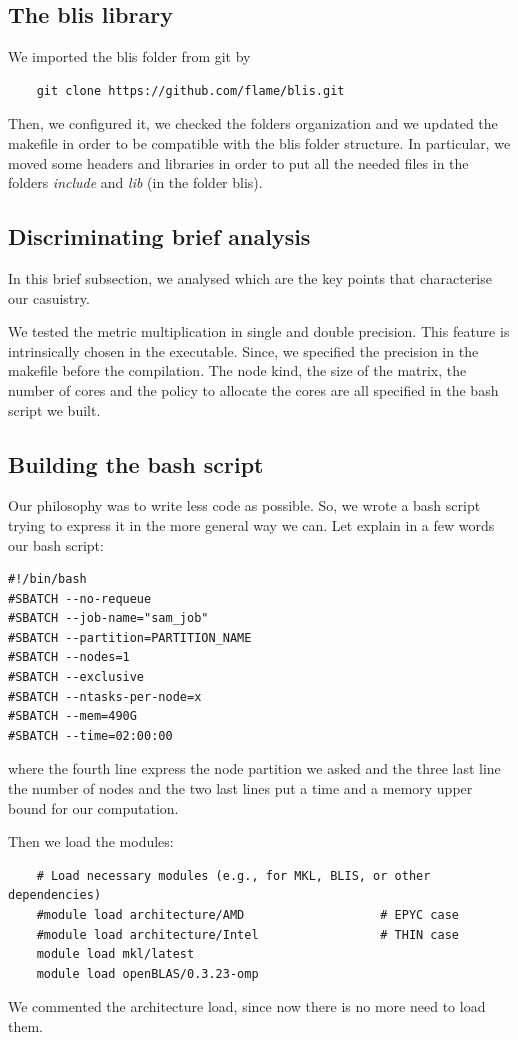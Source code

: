 \documentclass{article}
\begin{document}
\subsection{The blis library}
We imported the blis folder from git by
\begin{verbatim}
    git clone https://github.com/flame/blis.git
\end{verbatim}
Then, we configured it, we checked the folders organization and we updated the makefile in order to be compatible with the blis folder structure.   
In particular, we moved some headers and libraries in order to put all the needed files in the folders \textit{include} and \textit{lib} (in the folder blis).

\subsection{Discriminating brief analysis}
In this brief subsection, we analysed which are the key points that characterise our casuistry.  

We tested the metric multiplication in single and double precision. This feature is intrinsically chosen in the executable. Since, we specified the precision in the makefile before the compilation.
The node kind, the size of the matrix, the number of cores and the policy to allocate the cores are all specified in the bash script we built. 

\subsection{Building the bash script}
Our philosophy was to write less code as possible. So, we wrote a bash script trying to express it in the more general way we can.  
Let explain in a few words our bash script:
\begin{verbatim}
#!/bin/bash
#SBATCH --no-requeue
#SBATCH --job-name="sam_job"
#SBATCH --partition=PARTITION_NAME
#SBATCH --nodes=1
#SBATCH --exclusive
#SBATCH --ntasks-per-node=x
#SBATCH --mem=490G
#SBATCH --time=02:00:00
\end{verbatim}
where the fourth line express the node partition we asked and the three last line the number of nodes and the two last lines put a time and a memory upper bound for our computation.   

Then we load the modules:
\begin{verbatim}
    # Load necessary modules (e.g., for MKL, BLIS, or other dependencies)
    #module load architecture/AMD                   # EPYC case
    #module load architecture/Intel                 # THIN case
    module load mkl/latest
    module load openBLAS/0.3.23-omp
\end{verbatim}
We commented the architecture load, since now there is no more need to load them. 
\end{document}
